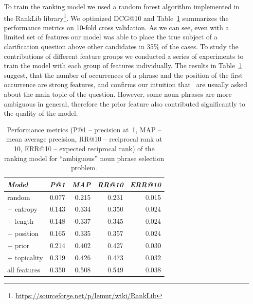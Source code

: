 To train the ranking model we used a random forest algorithm implemented in the RankLib library\footnote{\href{url}{https://sourceforge.net/p/lemur/wiki/RankLib}}.
We optimized DCG@10 and Table~\ref{table:conversation:clarq:np_rank_performance} summarizes the performance metrics on 10-fold cross validation.
As we can see, even with a limited set of features our model was able to place the true subject of a clarification question above other candidates in 35\% of the cases.
To study the contributions of different feature groups we conducted a series of experiments to train the model with each group of features individually.
The results in Table~\ref{table:conversation:clarq:np_rank_performance} suggest, that the number of occurrences of a phrase and the position of the first occurrence are strong features, and confirms our intuition that \clarQ~are usually asked about the main topic of the question.
However, some noun phrases are more ambiguous in general, therefore the prior feature also contributed significantly to the quality of the model.

\begin{table}[h]
\centering
\begin{tabular}[t]{lrrrr}
\textit{Model} & \textit{P@1} & \textit{MAP} & \textit{RR@10} & \textit{ERR@10} \\
\hline
random & 0.077 & 0.215 & 0.231 & 0.015 \\
+ entropy & 0.143 & 0.334 & 0.350 & 0.024 \\
+ length & 0.148 & 0.337 & 0.345 & 0.024 \\
+ position & 0.165 & 0.335 & 0.357 & 0.024 \\
+ prior & 0.214 & 0.402 & 0.427 & 0.030 \\
+ topicality & 0.319 & 0.426 & 0.473 & 0.032 \\
all features & 0.350 & 0.508 & 0.549 & 0.038 \\
\end{tabular}
\caption{Performance metrics (P@1 -- precision at~1, MAP -- mean average precision, RR@10 -- reciprocal rank at 10, ERR@10 -- expected reciprocal rank) of the ranking model for ``ambiguous'' noun phrase selection problem.}
\label{table:conversation:clarq:np_rank_performance}
\end{table}

